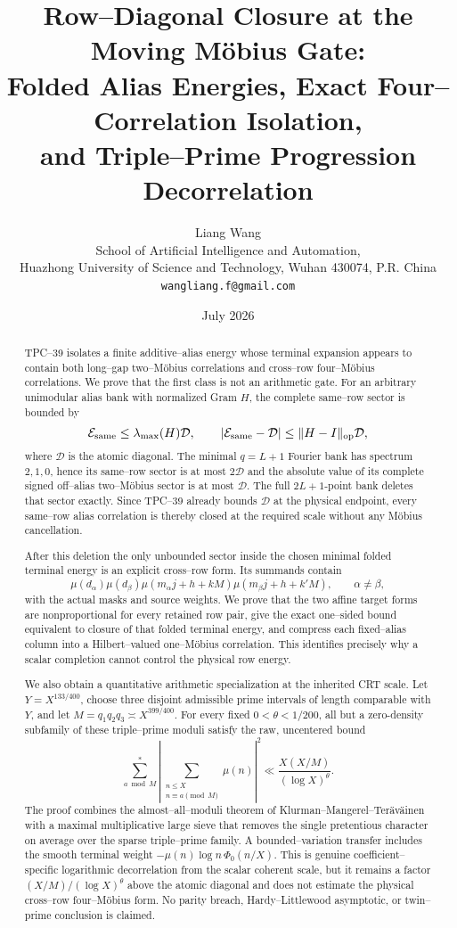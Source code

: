\documentclass[11pt]{article}
\title{\textbf{Row--Diagonal Closure at the Moving M\"obius Gate:}\\
\textbf{Folded Alias Energies, Exact Four--Correlation Isolation,}\\
\textbf{and Triple--Prime Progression Decorrelation}}
\author{Liang Wang\\
\small School of Artificial Intelligence and Automation,\\[-0.2em]
\small Huazhong University of Science and Technology, Wuhan 430074, P.R. China\\
\small \texttt{wangliang.f@gmail.com}}
\date{July 2026}
\theoremstyle{definition}
\theoremstyle{remark}
\newcommand{\cD}{\mathcal D}
\newcommand{\cE}{\mathcal E}
\newcommand{\op}{\operatorname{op}}
\begin{document}
\maketitle

\begin{abstract}
TPC--39 isolates a finite additive--alias energy whose terminal expansion
appears to contain both long--gap two--M\"obius correlations and cross--row
four--M\"obius correlations.  We prove that the first class is not an
arithmetic gate.  For an arbitrary unimodular alias bank with normalized
Gram \(H\), the complete same--row sector is bounded by
\[
 \cE_{\rm same}\le\lambda_{\max}(H)\cD,
 \qquad
 |\cE_{\rm same}-\cD|\le\|H-I\|_{\op}\cD,
\]
where \(\cD\) is the atomic diagonal.  The minimal \(q=L+1\) Fourier bank
has spectrum \(2,1,0\), hence its same--row sector is at most \(2\cD\) and
the absolute value of its complete signed off--alias two--M\"obius sector
is at most \(\cD\).  The full \(2L+1\)-point bank deletes that sector
exactly.  Since
TPC--39 already bounds \(\cD\) at the physical endpoint, every same--row
alias correlation is thereby closed at the required scale without any
M\"obius cancellation.

After this deletion the only unbounded sector inside the chosen minimal
folded terminal energy is an explicit cross--row form.  Its summands contain
\[
 \mu(d_\alpha)\mu(d_\beta)
 \mu(m_\alpha j+h+kM)\mu(m_\beta j+h+k'M),
 \qquad \alpha\ne\beta,
\]
with the actual masks and source weights.  We prove that the two affine
target forms are nonproportional for every retained row pair, give the
exact one--sided bound equivalent to closure of that folded terminal
energy, and compress each fixed--alias column into a Hilbert--valued
one--M\"obius correlation.  This
identifies precisely why a scalar completion cannot control the physical
row energy.

We also obtain a quantitative arithmetic specialization at the inherited
CRT scale.
Let \(Y=X^{133/400}\), choose three disjoint admissible prime intervals of
length comparable with \(Y\), and let \(M=q_1q_2q_3\asymp
X^{399/400}\).  For every fixed \(0<\theta<1/200\), all but a zero-density
subfamily of these triple--prime moduli satisfy the raw, uncentered bound
\[
 \sum_{a\bmod M}^{*}
 \left|\sum_{\substack{n\le X\\n\equiv a\pmod M}}\mu(n)\right|^2
 \ll \frac{X(X/M)}{(\log X)^\theta}.
\]
The proof combines the almost--all--moduli theorem of
Klurman--Mangerel--Ter\"av\"ainen with a maximal multiplicative large sieve
that removes the single pretentious character on average over the sparse
triple--prime family.  A bounded--variation transfer includes the smooth
terminal weight \(-\mu(n)\log n\,\Phi_0(n/X)\).  This is genuine
coefficient--specific logarithmic decorrelation from the scalar coherent
scale, but it remains a factor
\((X/M)/(\log X)^\theta\) above the atomic diagonal and does
not estimate the physical cross--row four--M\"obius form.  No parity
breach, Hardy--Littlewood asymptotic, or twin--prime conclusion is claimed.
\end{abstract}
\end{document}
